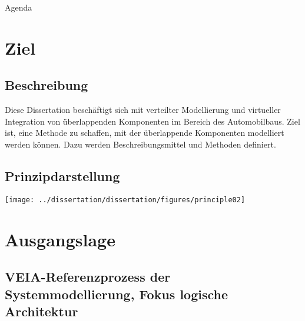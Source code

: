 	\begin{frame}{Agenda}
		\tableofcontents[hideallsubsections]
	\end{frame}


	\section{Ziel}

	\subsection{Beschreibung}

	\begin{frame}{\insertsectionhead}
		Diese Dissertation beschäftigt sich mit verteilter Modellierung und virtueller Integration von überlappenden Komponenten im Bereich des Automobilbaus.
		Ziel ist, eine Methode zu schaffen, mit der überlappende Komponenten modelliert werden können.
		Dazu werden Beschreibungsmittel und Methoden definiert.
	\end{frame}
	


	\subsection{Prinzipdarstellung}

	\begin{frame}{\insertsectionhead}{\insertsubsectionhead}
		\hfil\texttt{[image: ../dissertation/dissertation/figures/principle02]}\hfil
	\end{frame}

	\section{Ausgangslage}

	\subsection{VEIA-Referenzprozess der Systemmodellierung, Fokus logische Architektur}

